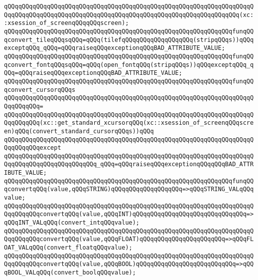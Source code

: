 \verb|qQQqqQQqqQQqqQQqqQQqqQQqqQQqqQQqqQQqqQQqqQQqqQQqqQQqqQQqqQQqqQQqqQQqqQQqqQQqqQQqqQQqqQQqqQQqqQQqqQQqqQQqqQQqqQQqqQQqqQQqqQQqqQQqqQQqqQQq(xc::xsession_of_screenqQQqqQQqscreen);|\newline
\newline
\verb|qQQqqQQqqQQqqQQqqQQqqQQqqQQqqQQqqQQqqQQqqQQqqQQqqQQqqQQqqQQqqQQqfunqQQqconvert_tileqQQqsqQQq=qQQq(tilefqQQqqQQqqQQqqQQqqQQq(stripqQQqs))qQQqexceptqQQq_qQQq=qQQqraiseqQQqexceptionqQQqBAD_ATTRIBUTE_VALUE;|\newline
\verb|qQQqqQQqqQQqqQQqqQQqqQQqqQQqqQQqqQQqqQQqqQQqqQQqqQQqqQQqqQQqqQQqfunqQQqconvert_fontqQQqsqQQq=qQQq(open_fontqQQq(stripqQQqs))qQQqexceptqQQq_qQQq=qQQqraiseqQQqexceptionqQQqBAD_ATTRIBUTE_VALUE;|\newline
\newline
\verb|qQQqqQQqqQQqqQQqqQQqqQQqqQQqqQQqqQQqqQQqqQQqqQQqqQQqqQQqqQQqqQQqfunqQQqconvert_cursorqQQqs|\newline
\verb|qQQqqQQqqQQqqQQqqQQqqQQqqQQqqQQqqQQqqQQqqQQqqQQqqQQqqQQqqQQqqQQqqQQqqQQqqQQqqQQq=|\newline
\verb|qQQqqQQqqQQqqQQqqQQqqQQqqQQqqQQqqQQqqQQqqQQqqQQqqQQqqQQqqQQqqQQqqQQqqQQqqQQqqQQq(xc::get_standard_xcursorqQQq(xc::xsession_of_screenqQQqscreen)qQQq(convert_standard_cursorqQQqs))qQQq|\newline
\verb|qQQqqQQqqQQqqQQqqQQqqQQqqQQqqQQqqQQqqQQqqQQqqQQqqQQqqQQqqQQqqQQqqQQqqQQqqQQqqQQqexcept|\newline
\verb|qQQqqQQqqQQqqQQqqQQqqQQqqQQqqQQqqQQqqQQqqQQqqQQqqQQqqQQqqQQqqQQqqQQqqQQqqQQqqQQqqQQqqQQqqQQqqQQq_qQQq=qQQqraiseqQQqexceptionqQQqqQQqBAD_ATTRIBUTE_VALUE;|\newline
\newline
\verb|qQQqqQQqqQQqqQQqqQQqqQQqqQQqqQQqqQQqqQQqqQQqqQQqqQQqqQQqqQQqqQQqfunqQQqconvertqQQq(value,qQQqSTRING)qQQqqQQqqQQqqQQqqQQq=>qQQqSTRING_VALqQQqvalue;|\newline
\verb|qQQqqQQqqQQqqQQqqQQqqQQqqQQqqQQqqQQqqQQqqQQqqQQqqQQqqQQqqQQqqQQqqQQqqQQqqQQqqQQqconvertqQQq(value,qQQqINT)qQQqqQQqqQQqqQQqqQQqqQQqqQQqqQQq=>qQQqINT_VALqQQq(convert_intqQQqvalue);|\newline
\verb|qQQqqQQqqQQqqQQqqQQqqQQqqQQqqQQqqQQqqQQqqQQqqQQqqQQqqQQqqQQqqQQqqQQqqQQqqQQqqQQqconvertqQQq(value,qQQqFLOAT)qQQqqQQqqQQqqQQqqQQqqQQq=>qQQqFLOAT_VALqQQq(convert_floatqQQqvalue);|\newline
\verb|qQQqqQQqqQQqqQQqqQQqqQQqqQQqqQQqqQQqqQQqqQQqqQQqqQQqqQQqqQQqqQQqqQQqqQQqqQQqqQQqconvertqQQq(value,qQQqBOOL)qQQqqQQqqQQqqQQqqQQqqQQqqQQq=>qQQqBOOL_VALqQQq(convert_boolqQQqvalue);|\newline
